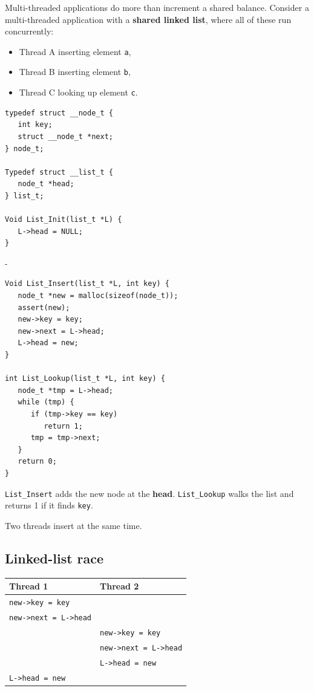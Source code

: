 \documentclass[11pt,a4paper]{article}
\makeatletter
\newcommand{\keepspace}[1]{\par\penalty-100\begingroup
  \setlength{\dimen@}{#1}\dimen@ii\pagegoal\advance\dimen@ii-\pagetotal
  \ifdim\dimen@>\dimen@ii\ifdim\dimen@ii>\z@\vfil\fi\break\fi\endgroup}
\makeatother
\begin{document}
Multi-threaded applications do more than increment a shared balance.
Consider a multi-threaded application with a \textbf{shared linked list},
where all of these run concurrently:
\begin{itemize}
  \item Thread A inserting element \texttt{a},
  \item Thread B inserting element \texttt{b},
  \item Thread C looking up element \texttt{c}.
\end{itemize}

\begin{lstlisting}
typedef struct __node_t {
   int key;
   struct __node_t *next;
} node_t;

Typedef struct __list_t {
   node_t *head;
} list_t;

Void List_Init(list_t *L) {
   L->head = NULL;
}
\end{lstlisting}

\keepspace{19\baselineskip}
\begin{lstlisting}[firstnumber=13]
Void List_Insert(list_t *L, int key) {
   node_t *new = malloc(sizeof(node_t));
   assert(new);
   new->key = key;
   new->next = L->head;
   L->head = new;
}

int List_Lookup(list_t *L, int key) {
   node_t *tmp = L->head;
   while (tmp) {
      if (tmp->key == key)
         return 1;
      tmp = tmp->next;
   }
   return 0;
}
\end{lstlisting}

\texttt{List\_Insert} adds the new node at the \textbf{head}.
\texttt{List\_Lookup} walks the list and returns 1 if it finds \texttt{key}.

\begin{quizbox}
Two threads insert at the same time.
\end{quizbox}

\subsection{Linked-list race}

\begin{center}
\renewcommand{\arraystretch}{1.15}
\begin{tabular}{@{}ll@{}}
  \toprule
  \textbf{Thread 1} & \textbf{Thread 2} \\
  \midrule
  \texttt{new->key = key} & \\
  \texttt{new->next = L->head} & \\
  & \texttt{new->key = key} \\
  & \texttt{new->next = L->head} \\
  & \texttt{L->head = new} \\
  \texttt{L->head = new} & \\
  \bottomrule
\end{tabular}
\end{center}
\end{document}
